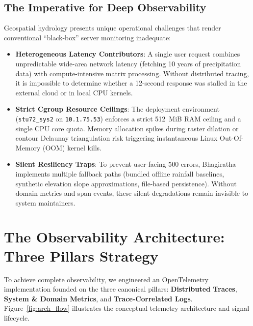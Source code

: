 \documentclass[11pt,a4paper]{article}
\begin{document}
\subsection{The Imperative for Deep Observability}
Geospatial hydrology presents unique operational challenges that render conventional ``black-box'' server monitoring inadequate:
\begin{itemize}[leftmargin=*]
    \item \textbf{Heterogeneous Latency Contributors}: A single user request combines unpredictable wide-area network latency (fetching 10 years of precipitation data) with compute-intensive matrix processing. Without distributed tracing, it is impossible to determine whether a 12-second response was stalled in the external cloud or in local CPU kernels.
    \item \textbf{Strict Cgroup Resource Ceilings}: The deployment environment (\texttt{stu72\_sys2} on \texttt{10.1.75.53}) enforces a strict 512~MiB RAM ceiling and a single CPU core quota. Memory allocation spikes during raster dilation or contour Delaunay triangulation risk triggering instantaneous Linux Out-Of-Memory (OOM) kernel kills.
    \item \textbf{Silent Resiliency Traps}: To prevent user-facing 500 errors, Bhagiratha implements multiple fallback paths (bundled offline rainfall baselines, synthetic elevation slope approximations, file-based persistence). Without domain metrics and span events, these silent degradations remain invisible to system maintainers.
\end{itemize}

\section{The Observability Architecture: Three Pillars Strategy}
\label{sec:architecture}

To achieve complete observability, we engineered an OpenTelemetry implementation founded on the three canonical pillars: \textbf{Distributed Traces}, \textbf{System \& Domain Metrics}, and \textbf{Trace-Correlated Logs}. Figure~\ref{fig:arch_flow} illustrates the conceptual telemetry architecture and signal lifecycle.
\end{document}

